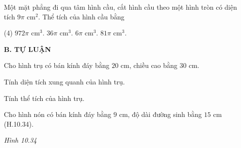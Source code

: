 \begin{exercises}
\begin{questions}[resume=SGK]
        \item Một mặt phẳng đi qua tâm hình cầu, cắt hình cầu theo một hình tròn có diện tích $9\pi$ cm$^2$. Thể tích của hình cầu bằng
        \begin{tasks}(4)
            \task $972\pi$ cm$^3$.
            \task $36\pi$ cm$^3$.
            \task $6\pi$ cm$^3$.
            \task $81\pi$ cm$^3$.
        \end{tasks}
        \par\noindent\answerbox\par
    \end{questions}

    \textbf{B. TỰ LUẬN}

    \begin{questions}[resume=SGK]
        \item Cho hình trụ có bán kính đáy bằng $20$ cm, chiều cao bằng $30$ cm.
        \begin{questions}
            \item Tính diện tích xung quanh của hình trụ.
            \item Tính thể tích của hình trụ.
        \end{questions}
        \answerline
        \answerline

        \item Cho hình nón có bán kính đáy bằng $9$ cm, độ dài đường sinh bằng $15$ cm (H.10.34).

        \begin{center}

            \textit{Hình 10.34}
        \end{center}


\end{questions}
\end{exercises}
